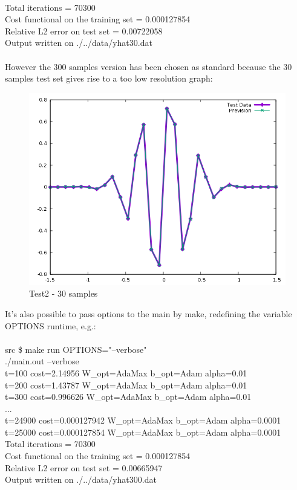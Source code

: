 \documentclass[12pt, a4paper]{report}
\theoremstyle{definition}
\begin{document}
{\\ \ttfamily 
	Total iterations = 70300\\
	Cost functional on the training set = 0.000127854\\
	Relative L2 error on test set = 0.00722058\\
	Output written on ./../data/yhat30.dat\\
\\}
However the 300 samples version has been chosen as standard because the 30 samples test set gives rise to a too low resolution graph:
\begin{figure}[H]
	\centering
	\includegraphics[width=\textwidth]{img/Prevision30} 
	\caption{Test2 - 30 samples}
\end{figure}
\newpage \noindent It's also possible to pass options to the main by make, redefining the variable {\ttfamily OPTIONS} runtime, e.g.:\\
{\\ \ttfamily 
src \$ make run OPTIONS="--verbose" \\
./main.out --verbose\\
t=100 cost=2.14956 W\_opt=AdaMax b\_opt=Adam alpha=0.01\\
t=200 cost=1.43787 W\_opt=AdaMax b\_opt=Adam alpha=0.01\\
t=300 cost=0.996626 W\_opt=AdaMax b\_opt=Adam alpha=0.01\\
...\\
t=24900 cost=0.000127942 W\_opt=AdaMax b\_opt=Adam alpha=0.0001\\
t=25000 cost=0.000127854 W\_opt=AdaMax b\_opt=Adam alpha=0.0001\\
Total iterations = 70300\\
Cost functional on the training set = 0.000127854\\
Relative L2 error on test set = 0.00665947\\
Output written on ./../data/yhat300.dat\\
\\}
\end{document}
